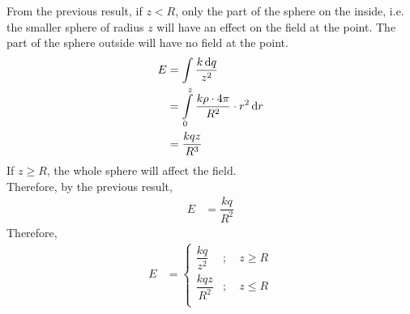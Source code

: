 \documentclass[fleqn, a4paper, 12pt, oneside]{amsart}
\theoremstyle{definition}
\theoremstyle{theorem}
\begin{document}
\begin{solution}
	 From the previous result, if $z < R$, only the part of the sphere on the inside, i.e. the smaller sphere of radius $z$ will have an effect on the field at the point.
	 The part of the sphere outside will have no field at the point.\\
	 \begin{align*}
	 	 E &= \int \dfrac{k \dif q}{z^2}\\
	 	 &= \int\limits_{0}^{z} \dfrac{k \rho \cdot 4 \pi}{R^2} \cdot r^2 \dif r\\
	 	 &= \dfrac{k q z}{R^3}
	 \end{align*}
	 If $z \geq R$, the whole sphere will affect the field.\\
	 Therefore, by the previous result,
	\begin{align*}
		E &= \dfrac{k q}{R^2}
	\end{align*}
	Therefore,
	\begin{align*}
		E &= 
			\begin{cases}
				\dfrac{k q}{z^2} &;\quad z \geq R\\
				\dfrac{k q z}{R^2} &;\quad z \leq R\\
			\end{cases}
	\end{align*}
	\begin{figure}[H]
	\end{figure}
\end{solution}
\end{document}

